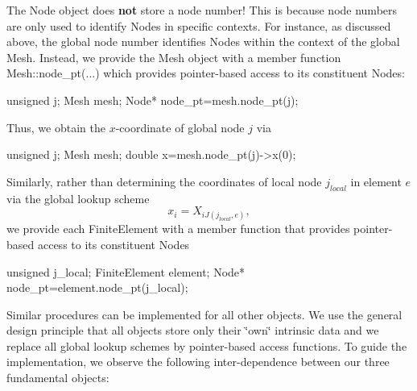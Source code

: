 The Node object does {\bfseries not} store a node number! This is because node numbers are only used to identify Nodes in specific contexts. For instance, as discussed above, the global node number identifies Nodes within the context of the global Mesh. Instead, we provide the Mesh object with a member function {\ttfamily Mesh\-::node\-\_\-pt}(...) which provides pointer-\/based access to its constituent Nodes\-: 
\begin{DoxyCode}
\textcolor{keywordtype}{unsigned} j;
Mesh mesh;
Node* node\_pt=mesh.node\_pt(j);
\end{DoxyCode}
 Thus, we obtain the $x$-\/coordinate of global node $j$ via 
\begin{DoxyCode}
\textcolor{keywordtype}{unsigned} j;
Mesh mesh;
\textcolor{keywordtype}{double} x=mesh.node\_pt(j)->x(0);
\end{DoxyCode}
 Similarly, rather than determining the coordinates of local node $j_{local}$ in element $e$ via the global lookup scheme \[ x_i = X_{iJ(j_{local},e)}, \] we provide each {\ttfamily Finite\-Element} with a member function that provides pointer-\/based access to its constituent Nodes 
\begin{DoxyCode}
\textcolor{keywordtype}{unsigned} j\_local;
FiniteElement element;
Node* node\_pt=element.node\_pt(j\_local);
\end{DoxyCode}


Similar procedures can be implemented for all other objects. We use the general design principle that all objects store only their \char`\"{}own\char`\"{} intrinsic data and we replace all global lookup schemes by pointer-\/based access functions. To guide the implementation, we observe the following inter-\/dependence between our three fundamental objects\-:


